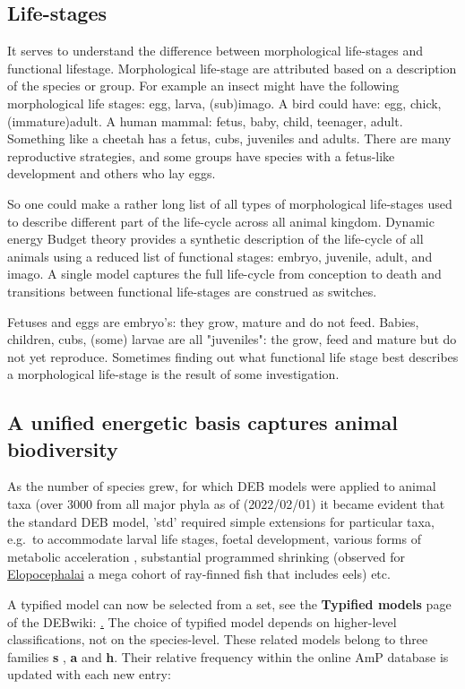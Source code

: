 
\subsection{Life-stages}

It serves to understand the difference between morphological life-stages and functional lifestage. Morphological life-stage are attributed based on a description of the species or group.
For example an insect might have the following morphological life stages: egg, larva, (sub)imago. 
A bird could have: egg, chick, (immature)adult. 
A human mammal: fetus, baby, child, teenager, adult. 
Something like a cheetah has a fetus, cubs, juveniles and adults. 
There are many reproductive strategies, and some groups have species with a fetus-like development and others who lay eggs. 

So one could make a rather long list of all types of morphological life-stages used to describe different part of the life-cycle across all animal kingdom.
Dynamic energy Budget theory provides a synthetic description of the life-cycle of all animals using a reduced list of functional stages: embryo, juvenile, adult, and imago.
A single model captures the full life-cycle from conception to death and transitions between functional life-stages are construed as switches.

Fetuses and eggs are embryo's: they grow, mature and do not feed. 
Babies, children, cubs, (some) larvae are all "juveniles": the grow, feed and mature but do not yet reproduce.
Sometimes finding out what functional life stage best describes a morphological life-stage is the result of some investigation.

\subsection{A unified energetic basis captures animal biodiversity}

As the number of species grew, for which DEB models were applied to animal taxa (over 3000 from all major phyla as of (2022/02/01) it became evident that the standard DEB model, 'std' required simple extensions for particular taxa, e.g.\ to accommodate larval life stages, foetal development, various forms of metabolic acceleration \cite{Kooy2014}, substantial programmed shrinking (observed for \href{https://fishtreeoflife.org/taxonomy/megacohort/Elopocephalai/}{Elopocephalai} a mega cohort of ray-finned fish that includes eels)  etc.

A typified model can now be selected from a set, see the \textbf{Typified models} page of the DEBwiki: \href{http://www.debtheory.org/wiki/index.php?title=Typified_models}. 
The choice of typified model depends on higher-level classifications, not on the species-level. 
These related models belong to three families \textbf{s} , \textbf{a} and \textbf{h}. 
Their relative frequency within the online AmP database is updated with each new entry: 

